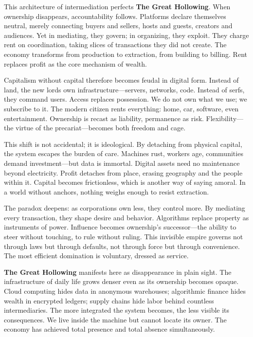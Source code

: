 \documentclass[11pt,twoside]{book}
\begin{document}
This architecture of intermediation perfects \textbf{The Great Hollowing}.  When ownership disappears, accountability follows.  Platforms declare themselves neutral, merely connecting buyers and sellers, hosts and guests, creators and audiences.  Yet in mediating, they govern; in organizing, they exploit.  They charge rent on coordination, taking slices of transactions they did not create.  The economy transforms from production to extraction, from building to billing.  Rent replaces profit as the core mechanism of wealth.

Capitalism without capital therefore becomes feudal in digital form.  Instead of land, the new lords own infrastructure—servers, networks, code.  Instead of serfs, they command users.  Access replaces possession.  We do not own what we use; we subscribe to it.  The modern citizen rents everything: home, car, software, even entertainment.  Ownership is recast as liability, permanence as risk.  Flexibility—the virtue of the precariat—becomes both freedom and cage.

This shift is not accidental; it is ideological.  By detaching from physical capital, the system escapes the burden of care.  Machines rust, workers age, communities demand investment—but data is immortal.  Digital assets need no maintenance beyond electricity.  Profit detaches from place, erasing geography and the people within it.  Capital becomes frictionless, which is another way of saying amoral.  In a world without anchors, nothing weighs enough to resist extraction.

The paradox deepens: as corporations own less, they control more.  By mediating every transaction, they shape desire and behavior.  Algorithms replace property as instruments of power.  Influence becomes ownership’s successor—the ability to steer without touching, to rule without ruling.  This invisible empire governs not through laws but through defaults, not through force but through convenience.  The most efficient domination is voluntary, dressed as service.

\textbf{The Great Hollowing} manifests here as disappearance in plain sight.  The infrastructure of daily life grows denser even as its ownership becomes opaque.  Cloud computing hides data in anonymous warehouses; algorithmic finance hides wealth in encrypted ledgers; supply chains hide labor behind countless intermediaries.  The more integrated the system becomes, the less visible its consequences.  We live inside the machine but cannot locate its owner.  The economy has achieved total presence and total absence simultaneously.
\end{document}

